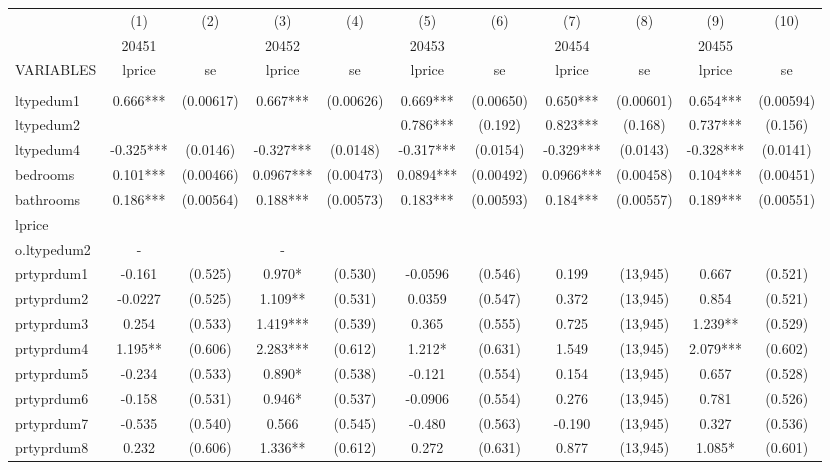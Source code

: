 \documentclass[]{article}
\begin{document}
\begin{tabular}{lcccccccccc} \hline
 & (1) & (2) & (3) & (4) & (5) & (6) & (7) & (8) & (9) & (10) \\
 & 20451 &  & 20452 &  & 20453 &  & 20454 &  & 20455 &  \\
VARIABLES & lprice & se & lprice & se & lprice & se & lprice & se & lprice & se \\ \hline
 &  &  &  &  &  &  &  &  &  &  \\
ltypedum1 & 0.666*** & (0.00617) & 0.667*** & (0.00626) & 0.669*** & (0.00650) & 0.650*** & (0.00601) & 0.654*** & (0.00594) \\
ltypedum2 &  &  &  &  & 0.786*** & (0.192) & 0.823*** & (0.168) & 0.737*** & (0.156) \\
ltypedum4 & -0.325*** & (0.0146) & -0.327*** & (0.0148) & -0.317*** & (0.0154) & -0.329*** & (0.0143) & -0.328*** & (0.0141) \\
bedrooms & 0.101*** & (0.00466) & 0.0967*** & (0.00473) & 0.0894*** & (0.00492) & 0.0966*** & (0.00458) & 0.104*** & (0.00451) \\
bathrooms & 0.186*** & (0.00564) & 0.188*** & (0.00573) & 0.183*** & (0.00593) & 0.184*** & (0.00557) & 0.189*** & (0.00551) \\
lprice &  &  &  &  &  &  &  &  &  &  \\
o.ltypedum2 & - &  & - &  &  &  &  &  &  &  \\
prtyprdum1 & -0.161 & (0.525) & 0.970* & (0.530) & -0.0596 & (0.546) & 0.199 & (13,945) & 0.667 & (0.521) \\
prtyprdum2 & -0.0227 & (0.525) & 1.109** & (0.531) & 0.0359 & (0.547) & 0.372 & (13,945) & 0.854 & (0.521) \\
prtyprdum3 & 0.254 & (0.533) & 1.419*** & (0.539) & 0.365 & (0.555) & 0.725 & (13,945) & 1.239** & (0.529) \\
prtyprdum4 & 1.195** & (0.606) & 2.283*** & (0.612) & 1.212* & (0.631) & 1.549 & (13,945) & 2.079*** & (0.602) \\
prtyprdum5 & -0.234 & (0.533) & 0.890* & (0.538) & -0.121 & (0.554) & 0.154 & (13,945) & 0.657 & (0.528) \\
prtyprdum6 & -0.158 & (0.531) & 0.946* & (0.537) & -0.0906 & (0.554) & 0.276 & (13,945) & 0.781 & (0.526) \\
prtyprdum7 & -0.535 & (0.540) & 0.566 & (0.545) & -0.480 & (0.563) & -0.190 & (13,945) & 0.327 & (0.536) \\
prtyprdum8 & 0.232 & (0.606) & 1.336** & (0.612) & 0.272 & (0.631) & 0.877 & (13,945) & 1.085* & (0.601) \\

\end{tabular}
\end{document}
